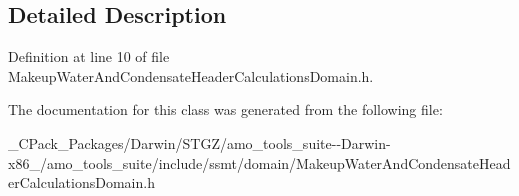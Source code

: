 \subsection{Detailed Description}


Definition at line 10 of file Makeup\+Water\+And\+Condensate\+Header\+Calculations\+Domain.\+h.



The documentation for this class was generated from the following file\+:\begin{DoxyCompactItemize}
\item 
\+\_\+\+C\+Pack\+\_\+\+Packages/\+Darwin/\+S\+T\+G\+Z/amo\+\_\+tools\+\_\+suite-\/-\/\+Darwin-\/x86\+\_/amo\+\_\+tools\+\_\+suite/include/ssmt/domain/Makeup\+Water\+And\+Condensate\+Header\+Calculations\+Domain.\+h\end{DoxyCompactItemize}
